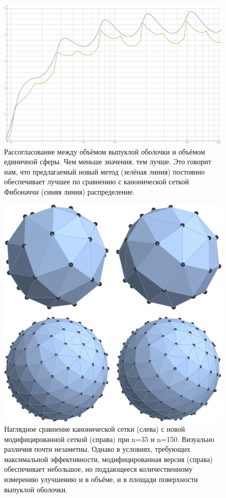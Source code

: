 \documentclass[12pt, a4paper]{article}
\begin{document}
\begin{figure}[H]
    \centering
    \includegraphics[width=\textwidth]{images/5.png}
    \caption{Рассогласование между объёмом выпуклой оболочки и объёмом единичной сферы. Чем меньше значения, тем лучше. Это говорит нам, что предлагаемый новый метод (зелёная линия) постоянно обеспечивает лучшее по сравнению с канонической сеткой Фибоначчи (синяя линия) распределение.}
\end{figure}

\begin{figure}[H]
    \centering
    \includegraphics[width=\textwidth]{images/6.png}
    \caption{Наглядное сравнение канонической сетки (слева) с новой модифицированной сеткой (справа) при n=35 и n=150. Визуально различия почти незаметны. Однако в условиях, требующих максимальной эффективности, модифицированная версия (справа) обеспечивает небольшое, но поддающееся количественному измерению улучшению и в объёме, и в площади поверхности выпуклой оболочки.}
\end{figure}
\end{document}
